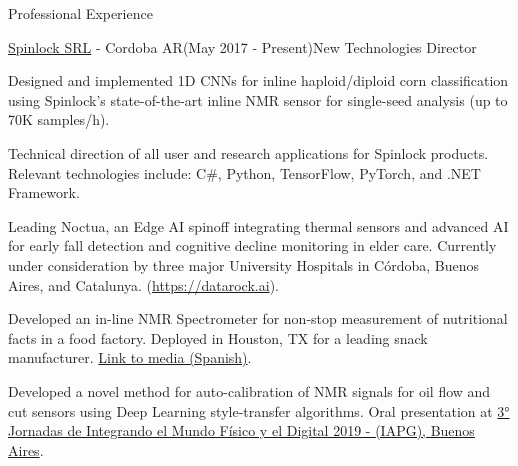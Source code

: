 \documentclass{resume}
\begin{document}
\begin{rSection}{Professional Experience}

\begin{rSubsection}{\href{https://spinlock.com.ar}{Spinlock SRL} - Cordoba AR}{(May 2017 - Present)}{New Technologies Director}{}
\item Designed and implemented 1D CNNs for inline haploid/diploid corn classification using Spinlock’s state-of-the-art inline NMR sensor for single-seed analysis (up to 70K samples/h).
\\
\item Technical direction of all user and research applications for Spinlock products. Relevant technologies include: C\#, Python, TensorFlow, PyTorch, and .NET Framework.
\\
\item Leading Noctua, an Edge AI spinoff integrating thermal sensors and advanced AI for early fall detection and cognitive decline monitoring in elder care. Currently under consideration by three major University Hospitals in Córdoba, Buenos Aires, and Catalunya. (\href{https://datarock.ai}{{https://datarock.ai}}).
\\
\item Developed an in-line NMR Spectrometer for non-stop measurement of nutritional facts in a food factory. Deployed in Houston, TX for a leading snack manufacturer. \href{https://www.lavoz.com.ar/negocios/una-pyme-cordobesa-desarrollo-un-tomografo-de-papas-para-pepsico}{Link to media (Spanish)}.
\\
\item Developed a novel method for auto-calibration of NMR signals for oil flow and cut sensors using Deep Learning style-transfer algorithms. Oral presentation at \href{http://www.iapg.org.ar/congresos/2019/JIT3/programa.pdf}{3° Jornadas de Integrando el Mundo Físico y el Digital 2019 - (IAPG), Buenos Aires}.


\end{rSubsection}
\end{rSection}
\end{document}
